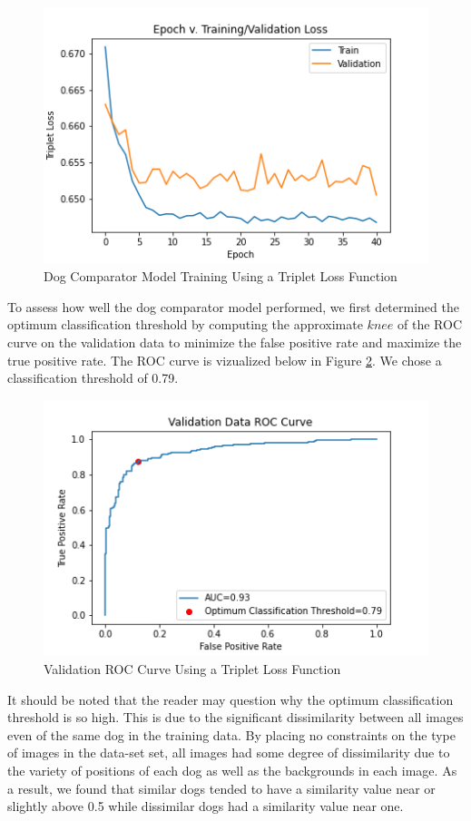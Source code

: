 \documentclass{article}
\begin{document}
\begin{figure}[h]
\centering
	\includegraphics[scale=0.7]{final-report-images/triplet_training.png}
\caption{Dog Comparator Model Training Using a Triplet Loss Function}
\label{fig:x epoch_v_map}
\end{figure}
To assess how well the dog comparator model performed, we first determined the optimum classification threshold by computing the approximate $knee$ of the ROC curve on the validation data to minimize the false positive rate and maximize the true positive rate.  The ROC curve is vizualized below in Figure \ref{fig:x val roc curve}.  We chose a classification threshold of 0.79.

\begin{figure}[h]
\centering
	\includegraphics[scale=0.7]{final-report-images/roc_curve_validation_triplet.png}
\caption{Validation ROC Curve Using a Triplet Loss Function}
\label{fig:x val roc curve}
\end{figure}

\noindent It should be noted that the reader may question why the optimum classification threshold is so high.  This is due to the significant dissimilarity between all images even of the same dog in the training data.  By placing no constraints on the type of images in the data-set set, all images had some degree of dissimilarity due to the variety of positions of each dog as well as the backgrounds in each image.  As a result, we found that similar dogs tended to have a similarity value near or slightly above 0.5 while dissimilar dogs had a similarity value near one.  
\end{document}
